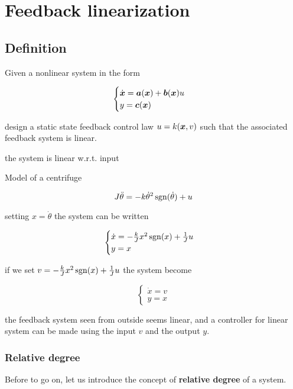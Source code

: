 \chapter{Feedback linearization}

\section{Definition}

Given a nonlinear system in the form

\[
    \begin{cases}
        \dot{\boldsymbol{x}} =\boldsymbol{a}(\boldsymbol{x}) + \boldsymbol{b}(\boldsymbol{x}) u \\
        y = \boldsymbol{c}(\boldsymbol{x})
    \end{cases}
\]

design a static state feedback control law $u = k(\boldsymbol{x},v)$ such that the associated feedback system is linear.

\begin{nb}the system is linear w.r.t. input\end{nb}

\begin{example}
    Model of a centrifuge

    \[
        J \ddot\theta = -k \dot \theta^2 \operatorname{sgn}(\dot \theta) + u
    \]

    setting $x = \dot\theta$ the system can be written

    \[
    \begin{cases}
        \dot x = - \frac{k}{J} x^2 \operatorname{sgn}(x) + \frac{1}{J} u \\
        y = x
    \end{cases}
    \]

    if we set $v = - \frac{k}{J}x^2 \operatorname{sgn}(x) + \frac{1}{J}u$ the system become

    \[
    \begin{cases}
        \dot x = v \\
        y = x
    \end{cases}
    \]

    the feedback system seen from outside seems linear, and a controller for linear system can be made using the input $v$ and the output $y$.
\end{example}

\subsection{Relative degree}

Before to go on, let us introduce the concept of \textbf{relative degree} of a system.

